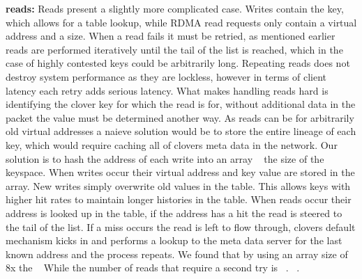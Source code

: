 \textbf{reads:} Reads present a slightly more complicated case. Writes contain
the key, which allows for a table lookup, while RDMA read requests only contain
a virtual address and a size. When a read fails it must be retried, as mentioned
earlier reads are performed iteratively until the tail of the list is reached,
which in the case of highly contested keys could be arbitrarily long. Repeating
reads does not destroy system performance as they are lockless, however in terms
of client latency each retry adds serious latency. What makes handling reads
hard is identifying the clover key for which the read is for, without additional
data in the packet the value must be determined another way. As reads can be for
arbitrarily old virtual addresses a naieve solution would be to store the entire
lineage of each key, which would require caching all of clovers meta data in the
network. Our solution is to hash the address of each write into an array
~ the size of the keyspace. When writes occur their virtual address and
key value are stored in the array. New writes simply overwrite old values in the
table. This allows keys with higher hit rates to maintain longer histories in
the table. When reads occur their address is looked up in the table, if the
address has a hit the read is steered to the tail of the list. If a miss occurs
the read is left to flow through, clovers default mechanism kicks in and
performs a lookup to the meta data server for the last known address and the
process repeats. We found that by using an array size of 8x the ~ While the number of reads that require a
second try is ~. ~.




 

